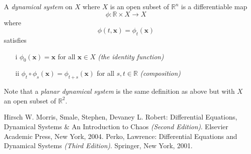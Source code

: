 \documentclass[12pt]{article}
\begin{document}
A \emph{dynamical system} on $X$ where $X$ is an open subset of $\mathbb{R}^n$ is a differentiable map
$$\phi: \mathbb{R}\times X \to X$$
where
$$\phi (t,\mathbf{x}) = \phi_t (\mathbf{x})$$
satisfies
\begin{itemize}
\item[i] $\phi_0(\mathbf{x}) = \mathbf{x}$ for all $\mathbf{x}\in X$ \textit{(the identity function)}
\item[ii] $\phi_t \circ \phi_s (\mathbf{x}) = \phi_{t+s}(\mathbf{x})$ for all $s,t \in \mathbb{R}$  \textit{(composition)}
\end{itemize}
\cite{1}\cite{2}

Note that a \emph{planar dynamical system} is the same definition as above but with $X$ an open subset of $\mathbb{R}^2$.

\begin{thebibliography}{2}
 Hirsch W. Morris, Smale, Stephen, Devaney L. Robert: Differential Equations, Dynamical Systems \& An Introduction to Chaos \textit{(Second Edition)}.  Elsevier Academic Press, New York, 2004. 
 Perko, Lawrence: Differential Equations and Dynamical Systems \textit{(Third Edition)}.  Springer, New York, 2001.
\end{thebibliography}
\end{document}
